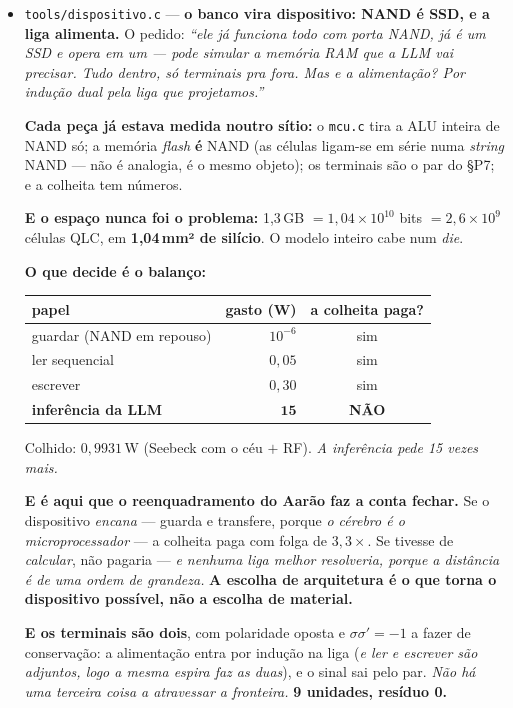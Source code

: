 \documentclass[11pt]{article}
\newcommand{\code}[1]{\texttt{\small #1}}
\theoremstyle{plain}
\theoremstyle{remark}
\begin{document}
\begin{itemize}
\item \code{tools/dispositivo.c} --- \textbf{o banco vira dispositivo: NAND é SSD, e a liga
alimenta.} O pedido: \emph{``ele já funciona todo com porta NAND, já é um SSD e opera em um --- pode
simular a memória RAM que a LLM vai precisar. Tudo dentro, só terminais pra fora. Mas e a
alimentação? Por indução dual pela liga que projetamos.''}

\textbf{Cada peça já estava medida noutro sítio:} o \code{mcu.c} tira a ALU inteira de NAND só; a
memória \emph{flash} \textbf{é} NAND (as células ligam-se em série numa \emph{string} NAND --- não é
analogia, é o mesmo objeto); os terminais são o par do §P7; e a colheita tem números.

\textbf{E o espaço nunca foi o problema:} 1,3\,GB $=1{,}04\times10^{10}$ bits $= 2{,}6\times10^{9}$
células QLC, em \textbf{1,04\,mm² de silício}. O modelo inteiro cabe num \emph{die}.

\textbf{O que decide é o balanço:}

\begin{center}
\begin{tabular}{lrc}
\toprule
papel & gasto (W) & a colheita paga? \\
\midrule
guardar (NAND em repouso) & $10^{-6}$ & sim \\
ler sequencial & $0{,}05$ & sim \\
escrever & $0{,}30$ & sim \\
\textbf{inferência da LLM} & $\mathbf{15}$ & \textbf{NÃO} \\
\bottomrule
\end{tabular}
\end{center}

Colhido: $0{,}9931$\,W (Seebeck com o céu $+$ RF). \emph{A inferência pede 15 vezes mais.}

\textbf{E é aqui que o reenquadramento do Aarão faz a conta fechar.} Se o dispositivo \emph{encana}
--- guarda e transfere, porque \emph{o cérebro é o microprocessador} --- a colheita paga com folga de
$3{,}3\times$. Se tivesse de \emph{calcular}, não pagaria --- \emph{e nenhuma liga melhor
resolveria, porque a distância é de uma ordem de grandeza.} \textbf{A escolha de arquitetura é o que
torna o dispositivo possível, não a escolha de material.}

\textbf{E os terminais são dois}, com polaridade oposta e $\sigma\sigma'=-1$ a fazer de conservação:
a alimentação entra por indução na liga (\emph{e ler e escrever são adjuntos, logo a mesma espira faz
as duas}), e o sinal sai pelo par. \emph{Não há uma terceira coisa a atravessar a fronteira.}
\textbf{9 unidades, resíduo 0.}

\end{itemize}
\end{document}
